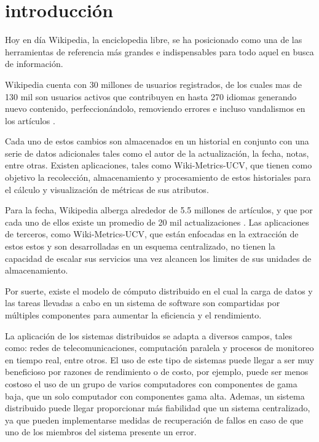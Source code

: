 \section*{introducción}

Hoy en día Wikipedia, la enciclopedia libre, se ha posicionado como una de las herramientas de 
referencia más grandes e indispensables para todo aquel en busca de información.

Wikipedia cuenta con 30 millones de usuarios registrados, de los cuales mas de 130 mil son 
usuarios activos que contribuyen en hasta 270 idiomas generando nuevo contenido, perfeccionándolo, 
removiendo errores e incluso vandalismos en los artículos \cite{1}.

Cada uno de estos cambios son almacenados en un historial en conjunto con una serie de datos
adicionales tales como el autor de la actualización, la fecha, notas, entre otras. Existen
aplicaciones, tales como Wiki-Metrics-UCV, que tienen como objetivo la recolección, almacenamiento 
y procesamiento de estos historiales para el cálculo y visualización de métricas de sus atributos.

Para la fecha, Wikipedia alberga alrededor de 5.5 millones de artículos, y que
por cada uno de ellos existe un promedio de 20 mil actualizaciones \cite{2}. Las aplicaciones de terceros,
como Wiki-Metrics-UCV, que están enfocadas en la extracción de estos estos y son desarrolladas
en un esquema centralizado, no tienen la capacidad de escalar sus servicios una vez alcancen 
los limites de sus unidades de almacenamiento.

Por suerte, existe el modelo de cómputo distribuido en el cual la carga de datos y las tareas llevadas a 
cabo en un sistema de software son compartidas por múltiples componentes para aumentar la
eficiencia y el rendimiento.

La aplicación de los sistemas distribuidos se adapta a diversos campos, tales como:
redes de telecomunicaciones, computación paralela y procesos de monitoreo en tiempo
real, entre otros. El uso de este tipo de sistemas puede llegar a ser muy beneficioso por 
razones de rendimiento o de costo, por ejemplo, puede ser menos costoso el uso de un grupo de varios
computadores con componentes de gama baja, que un solo computador con componentes gama alta. Ademas,
un sistema distribuido puede llegar proporcionar más fiabilidad que un sistema centralizado, ya
que pueden implementarse medidas de recuperación de fallos en caso de que uno de los miembros
del sistema presente un error.

